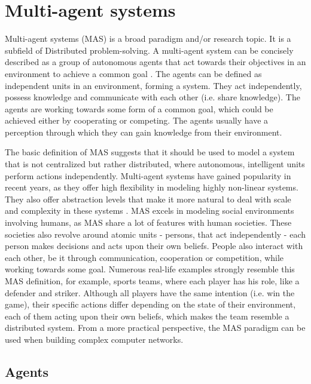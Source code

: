 \documentclass[0main.tex]{subfiles}
\begin{document}
\section{Multi-agent systems} \label{sec-mas}

Multi-agent systems (MAS) is a broad paradigm and/or research topic. It is a subfield of Distributed
problem-solving. A multi-agent system can be concisely described as a group
of autonomous agents that act towards their objectives in an environment to achieve a common goal
\cite{ParasumannaGokulan2010}. The agents can be defined as independent units in
an environment, forming a system. They act independently, possess
knowledge and communicate with each other (i.e. share knowledge). The agents
are working towards some form of a common goal, which could be achieved
either by cooperating or competing. The agents usually have a perception
through which they can gain knowledge from their environment.

The basic definition of MAS suggests that it should be used to model
a system that is not centralized but rather distributed, where autonomous, intelligent units perform
actions independently. Multi-agent systems have gained popularity in recent years, as they
offer high flexibility in modeling highly non-linear systems. They also offer abstraction levels that
make it more natural to deal with scale and complexity in these systems
\cite{Burmeister1997ApplicationOM}. MAS excels in modeling social environments
involving humans, as MAS share a lot of features with human societies. These societies also revolve
around atomic units - persons, that act independently - each person makes decisions and acts upon
their own beliefs. People also interact with each other, be it through communication, cooperation or
competition, while working towards some goal. Numerous real-life examples strongly
resemble this MAS definition, for example, sports teams, where each player has his role, like
a defender and striker. Although all players have the same intention (i.e. win the game), their
specific actions differ depending on the state of their environment, each of them acting upon their
own beliefs, which makes the team resemble a distributed system. From a more practical perspective,
the MAS paradigm can be used when building complex computer networks.

\subsection{Agents}
\end{document}
